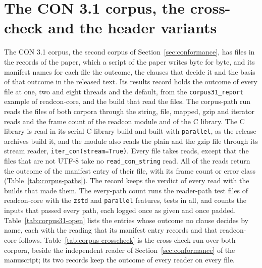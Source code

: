 \documentclass[preprint,12pt]{elsarticle}
\begin{document}
\FloatBarrier \section{The CON 3.1 corpus, the cross-check and the header variants}\label{sec:supp-corpus31} The CON 3.1 corpus, the second corpus of Section~\ref{sec:conformance}, has \cthreeoneFiles{} files in the records of the paper, which a script of the paper writes byte for byte, and its manifest names for each file the outcome, the clauses that decide it and the basis of that outcome in the released text.
Its results record holds the outcome of every file at one, two and eight threads and the default, from the \texttt{corpus31\_report} example of readcon-core, and the build that read the files.
The corpus-path run reads the \cpathsFiles{} files of both corpora through the string, file, mapped, gzip and iterator reads and the frame count of the readcon module and of the C library.
The C library is read in its serial C library build and built with \texttt{parallel}, as the release archives build it, and the module also reads the plain and the gzip file through its stream reader, \texttt{iter\_con(stream=True)}.
Every file takes \cpathsReadKinds{} reads, except that the \cpathsNotText{} files that are not UTF-8 take no \texttt{read\_con\_string} read.
All \cpathsMatch{} of the \cpathsReads{} reads return the outcome of the manifest entry of their file, with its frame count or error class (Table~\ref{tab:corpus-paths}).
The record keeps the verdict of every read with the builds that made them.
The every-path count runs the \everyPathTestFiles{} reader-path test files of readcon-core with the \texttt{zstd} and \texttt{parallel} features, \everyPathTests{} tests in all, and counts the \everyPathInputs{} inputs that passed every path, each logged once as given and once padded.
Table~\ref{tab:corpus31-open} lists the \cthreeoneNotExplicit{} entries whose outcome no clause decides by name, each with the reading that its manifest entry records and that readcon-core follows.
Table~\ref{tab:corpus-crosscheck} is the cross-check run over both corpora, beside the independent reader of Section~\ref{sec:conformance} of the manuscript; its two records keep the outcome of every reader on every file.
\end{document}
